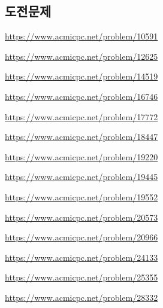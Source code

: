 \subsection{도전문제}
\begin{problem} \url{https://www.acmicpc.net/problem/10591} \end{problem}
\begin{problem} \url{https://www.acmicpc.net/problem/12625} \end{problem}
\begin{problem} \url{https://www.acmicpc.net/problem/14519} \end{problem}
\begin{problem} \url{https://www.acmicpc.net/problem/16746} \end{problem}
\begin{problem} \url{https://www.acmicpc.net/problem/17772} \end{problem}
\begin{problem} \url{https://www.acmicpc.net/problem/18447} \end{problem}
\begin{problem} \url{https://www.acmicpc.net/problem/19220} \end{problem}
\begin{problem} \url{https://www.acmicpc.net/problem/19445} \end{problem}
\begin{problem} \url{https://www.acmicpc.net/problem/19552} \end{problem}
\begin{problem} \url{https://www.acmicpc.net/problem/20573} \end{problem}
\begin{problem} \url{https://www.acmicpc.net/problem/20966} \end{problem}
\begin{problem} \url{https://www.acmicpc.net/problem/24133} \end{problem}   
\begin{problem} \url{https://www.acmicpc.net/problem/25355} \end{problem}
\begin{problem} \url{https://www.acmicpc.net/problem/28332} \end{problem}
